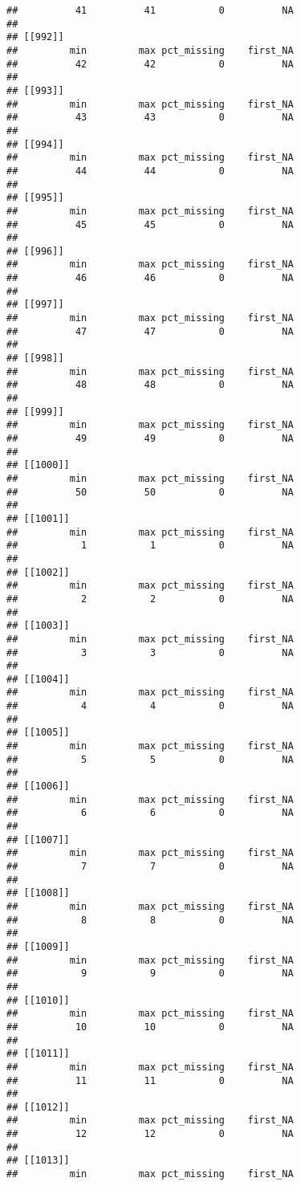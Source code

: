 \documentclass[
]{article}
\begin{document}
\begin{verbatim}
##          41          41           0          NA 
## 
## [[992]]
##         min         max pct_missing    first_NA 
##          42          42           0          NA 
## 
## [[993]]
##         min         max pct_missing    first_NA 
##          43          43           0          NA 
## 
## [[994]]
##         min         max pct_missing    first_NA 
##          44          44           0          NA 
## 
## [[995]]
##         min         max pct_missing    first_NA 
##          45          45           0          NA 
## 
## [[996]]
##         min         max pct_missing    first_NA 
##          46          46           0          NA 
## 
## [[997]]
##         min         max pct_missing    first_NA 
##          47          47           0          NA 
## 
## [[998]]
##         min         max pct_missing    first_NA 
##          48          48           0          NA 
## 
## [[999]]
##         min         max pct_missing    first_NA 
##          49          49           0          NA 
## 
## [[1000]]
##         min         max pct_missing    first_NA 
##          50          50           0          NA 
## 
## [[1001]]
##         min         max pct_missing    first_NA 
##           1           1           0          NA 
## 
## [[1002]]
##         min         max pct_missing    first_NA 
##           2           2           0          NA 
## 
## [[1003]]
##         min         max pct_missing    first_NA 
##           3           3           0          NA 
## 
## [[1004]]
##         min         max pct_missing    first_NA 
##           4           4           0          NA 
## 
## [[1005]]
##         min         max pct_missing    first_NA 
##           5           5           0          NA 
## 
## [[1006]]
##         min         max pct_missing    first_NA 
##           6           6           0          NA 
## 
## [[1007]]
##         min         max pct_missing    first_NA 
##           7           7           0          NA 
## 
## [[1008]]
##         min         max pct_missing    first_NA 
##           8           8           0          NA 
## 
## [[1009]]
##         min         max pct_missing    first_NA 
##           9           9           0          NA 
## 
## [[1010]]
##         min         max pct_missing    first_NA 
##          10          10           0          NA 
## 
## [[1011]]
##         min         max pct_missing    first_NA 
##          11          11           0          NA 
## 
## [[1012]]
##         min         max pct_missing    first_NA 
##          12          12           0          NA 
## 
## [[1013]]
##         min         max pct_missing    first_NA 

\end{verbatim}
\end{document}
